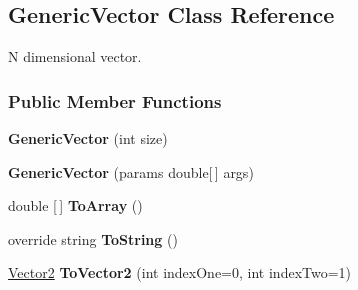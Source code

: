 \hypertarget{classDataTools_1_1GenericVector}{}\subsection{Generic\+Vector Class Reference}
\label{classDataTools_1_1GenericVector}


N dimensional vector.  


\subsubsection*{Public Member Functions}
\begin{DoxyCompactItemize}
\item 
\mbox{\label{classDataTools_1_1GenericVector_aaa9bcf132f1691298b9bb672f22787d2}} 
{\bfseries Generic\+Vector} (int size)
\item 
\mbox{\label{classDataTools_1_1GenericVector_a542ba2abc2b5ad8a398ad97bf2a682b0}} 
{\bfseries Generic\+Vector} (params double\mbox{[}$\,$\mbox{]} args)
\item 
\mbox{\label{classDataTools_1_1GenericVector_adf109e0e2008229e56ef6f898425311d}} 
double \mbox{[}$\,$\mbox{]} {\bfseries To\+Array} ()
\item 
\mbox{\label{classDataTools_1_1GenericVector_aa73e7c4dd1df5fd5fbf81c7764ee1533}} 
override string {\bfseries To\+String} ()
\item 
\mbox{\label{classDataTools_1_1GenericVector_a31e1a43cd76a962c919d06400fdcc10b}} 
\hyperlink{classDataTools_1_1Vector2}{Vector2} {\bfseries To\+Vector2} (int index\+One=0, int index\+Two=1)
\end{DoxyCompactItemize}
